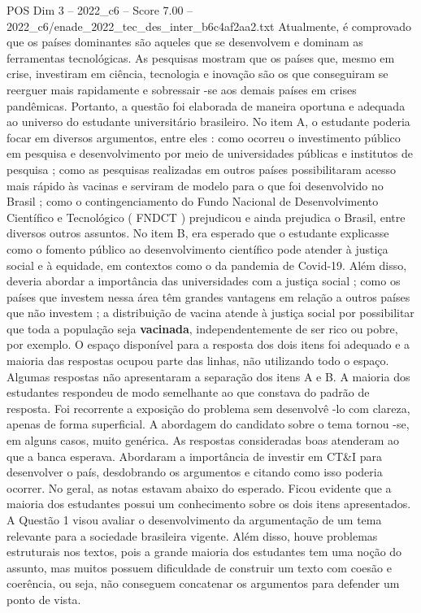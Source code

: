 \begin{textsample}{POS Dim 3 – 2022\_c6 – Score 7.00 – 2022\_c6/enade\_2022\_tec\_des\_inter\_b6c4af2aa2.txt}
Atualmente, é comprovado que os países dominantes são aqueles que se desenvolvem e dominam as ferramentas tecnológicas.
As pesquisas mostram que os países que, mesmo em crise, investiram em ciência, tecnologia e inovação são os que conseguiram se reerguer mais rapidamente e sobressair -se aos demais países em crises pandêmicas.
Portanto, a questão foi elaborada de maneira oportuna e adequada ao universo do estudante universitário brasileiro.
No item A, o estudante poderia focar em diversos argumentos, entre eles : como ocorreu o investimento público em pesquisa e desenvolvimento por meio de universidades públicas e institutos de pesquisa ; como as pesquisas realizadas em outros países possibilitaram acesso mais rápido às vacinas e serviram de modelo para o que foi desenvolvido no Brasil ; como o contingenciamento do Fundo Nacional de Desenvolvimento Científico e Tecnológico ( FNDCT ) prejudicou e ainda prejudica o Brasil, entre diversos outros assuntos.
No item B, era esperado que o estudante explicasse como o fomento público ao desenvolvimento científico pode atender à justiça social e à equidade, em contextos como o da pandemia de Covid-19.
Além disso, deveria abordar a importância das universidades com a justiça social ; como os países que investem nessa área têm grandes vantagens em relação a outros países que não investem ; a distribuição de vacina atende à justiça social por possibilitar que toda a população seja \textbf{vacinada}, independentemente de ser rico ou pobre, por exemplo.
O espaço disponível para a resposta dos dois itens foi adequado e a maioria das respostas ocupou parte das linhas, não utilizando todo o espaço.
Algumas respostas não apresentaram a separação dos itens A e B.
A maioria dos estudantes respondeu de modo semelhante ao que constava do padrão de resposta.
Foi recorrente a exposição do problema sem desenvolvê -lo com clareza, apenas de forma superficial.
A abordagem do candidato sobre o tema tornou -se, em alguns casos, muito genérica.
As respostas consideradas boas atenderam ao que a banca esperava.
Abordaram a importância de investir em CT\&I para desenvolver o país, desdobrando os argumentos e citando como isso poderia ocorrer.
No geral, as notas estavam abaixo do esperado.
Ficou evidente que a maioria dos estudantes possui um conhecimento sobre os dois itens apresentados.
A Questão 1 visou avaliar o desenvolvimento da argumentação de um tema relevante para a sociedade brasileira vigente.
Além disso, houve problemas estruturais nos textos, pois a grande maioria dos estudantes tem uma noção do assunto, mas muitos possuem dificuldade de construir um texto com coesão e coerência, ou seja, não conseguem concatenar os argumentos para defender um ponto de vista.

\end{textsample}
